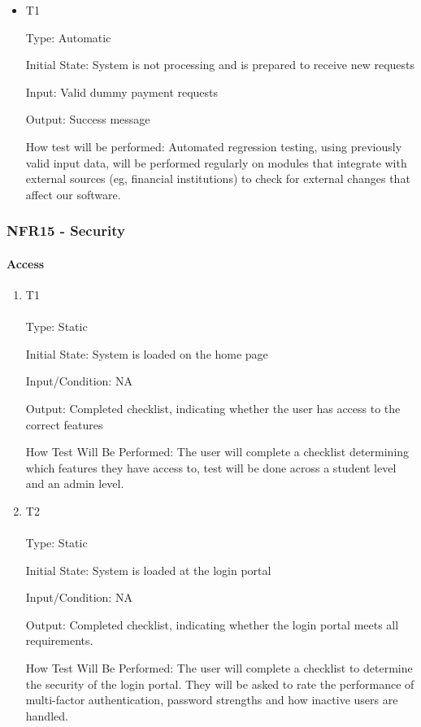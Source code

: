 \documentclass[12pt, titlepage]{article}
\begin{document}
\begin{itemize}

\item{T1\\}

Type: Automatic

Initial State: System is not processing and is prepared to receive new requests

Input: Valid dummy payment requests

Output: Success message

How test will be performed: Automated regression testing, using previously valid input data, will be performed regularly on modules that integrate with external sources (eg, financial institutions) to check for external changes that affect our software.

\end{itemize}

\subsubsection{NFR15 - Security}
\paragraph{Access}
\begin{enumerate}
\item {T1\\}\\
Type: Static

Initial State: System is loaded on the home page

Input/Condition: NA

Output: Completed checklist, indicating whether the user has access to the correct features

How Test Will Be Performed: The user will complete a checklist determining which features they have access to, test will be done across a student level and an admin level.

\item {T2\\}\\
Type: Static

Initial State: System is loaded at the login portal

Input/Condition: NA

Output: Completed checklist, indicating whether the login portal meets all requirements.

How Test Will Be Performed: The user will complete a checklist to determine the security of the login portal. They will be asked to rate the performance of multi-factor authentication, password strengths and how inactive users are handled.
\end{enumerate}
\end{document}
